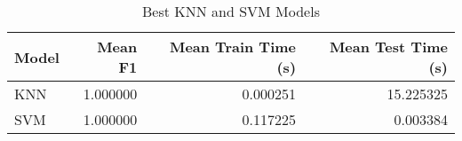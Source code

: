 \begin{table}[!htbp]
\centering
\caption{Best KNN and SVM Models}
\label{tab:best_knn_and_svm_summary_mushroom}
\begin{tabular}{lrrr}
\toprule
Model & Mean F1 & Mean Train Time (s) & Mean Test Time (s) \\
\midrule
KNN & 1.000000 & 0.000251 & 15.225325 \\
SVM & 1.000000 & 0.117225 & 0.003384 \\
\bottomrule
\end{tabular}
\end{table}
